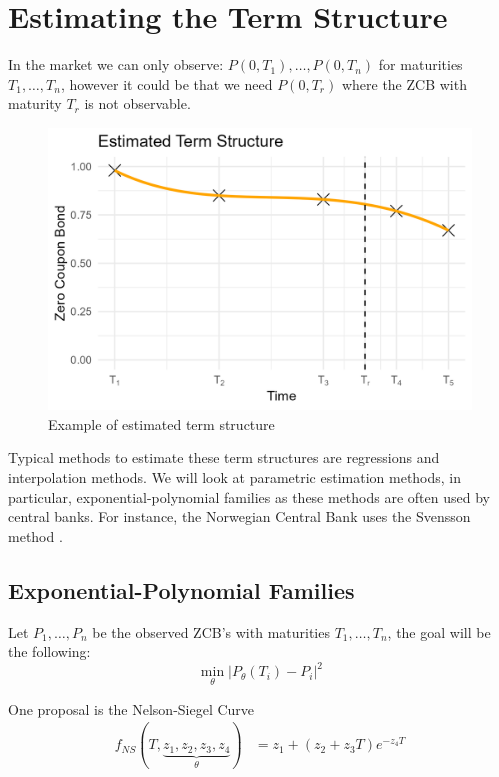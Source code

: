 \newpage 
\section{Estimating the Term Structure}
In the market we can only observe: $P(0,T_{1}), \dots, P(0, T_{n})$ for maturities $T_{1}, \dots, T_{n}$, however it could be that we need $P(0,T_{r})$ where the ZCB with maturity $T_{r}$ is not observable. 

\begin{figure}[htp]
    \centering
    \includegraphics[width=12cm]{figures/Estimating_term_structure.png}
    \caption{Example of estimated term structure}
    \label{fig: Estimaing_term_structure}
\end{figure}


Typical methods to estimate these term structures are regressions and interpolation methods. We will look at parametric estimation methods, in particular, exponential-polynomial families as these methods are often used by central banks. For instance, the Norwegian Central Bank uses the Svensson method \cite{NB_ZCB}.

\subsection{Exponential-Polynomial Families}
Let $P_{1}, \dots, P_{n}$ be the observed ZCB's with maturities $T_{1}, \dots, T_{n}$, the goal will be the following: 
\[
\min\limits_{\theta}|P_{\theta}(T_{i}) - P_{i}|^{2}
\]

One proposal is the Nelson-Siegel Curve
\begin{align*}
f_{NS}(T, \underbrace{z_{1}, z_{2}, z_{3}, z_{4}}_{\theta}) 
&= 
z_{1} + (z_{2} + z_{3}T)e^{-z_{4}T}
\end{align*}


